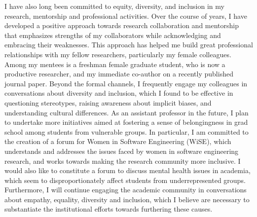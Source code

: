 I have also long been committed to equity, diversity, and inclusion in
my research, mentorship and professional activities. Over the course
of years, I have developed a positive approach towards research
collaboration and mentorship that emphasizes strengths of my
collaborators while acknowledging and embracing their weaknesses. This
approach has helped me build great professional relationships with my
fellow researchers, particularly my female colleagues. Among my
mentees is a freshman female graduate student, who is now a productive
researcher, and my immediate co-author on a recently published journal
paper. Beyond the formal channels, I frequently engage my colleagues
in conversations about diversity and inclusion, which I found to be
effective in questioning stereotypes, raising awareness about implicit
biases, and understanding cultural differences. As an assistant
professor in the future, I plan to undertake more initiatives aimed at
fostering a sense of belongingness in grad school among students from
vulnerable groups. In particular, I am committed to the creation of a
forum for Women in Software Engineering (WiSE), which understands and
addresses the issues faced by women in software engineering research,
and works towards making the research community more inclusive. I
would also like to constitute a forum to discuss mental health issues
in academia, which seem to disproportionately affect students from
underrepresented groups.  Furthermore, I will continue engaging the
academic community in conversations about empathy, equality, diversity
and inclusion, which I believe are necessary to substantiate the
institutional efforts towards furthering these causes.

